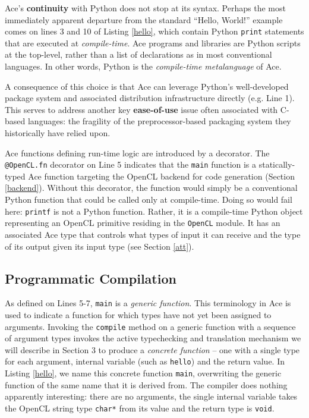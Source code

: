 \documentclass[9pt,preprint]{sigplanconf}
\begin{document}


Ace's \textbf{continuity} with Python does not stop at its syntax. 
Perhaps the most immediately apparent departure from the standard ``Hello, World!'' example comes on lines 3 and 10 of Listing \ref{hello}, which contain Python \verb|print| statements that are executed at {\em compile-time}.  Ace programs and libraries are Python scripts at the top-level, rather than a list of declarations as in most conventional languages. In other words, Python is the {\em compile-time metalanguage} of Ace. 

A consequence of this choice is that Ace can leverage Python's well-developed package system and associated distribution infrastructure directly (e.g. Line 1). This serves to address another key \textbf{ease-of-use} issue often associated with C-based languages: the fragility of the preprocessor-based packaging system they historically have relied upon. 

Ace functions defining run-time logic are introduced by a decorator. The \verb|@OpenCL.fn| decorator on Line 5 indicates that the \verb|main| function is a statically-typed Ace function targeting the OpenCL backend for code generation (Section \ref{backend}). Without this decorator, the function would simply be a conventional Python function that could be called only at compile-time. Doing so would fail here: \verb|printf| is not a Python function. Rather, it is a compile-time Python object representing an OpenCL primitive residing in the \verb|OpenCL| module. It has an associated Ace type that controls what types of input it can receive and the type of its output given its input type (see Section \ref{att}).

\subsection{Programmatic Compilation}
As defined on Lines 5-7, \verb|main| is a \emph{generic function}. This terminology in Ace is used to indicate a function for which types have not yet been assigned to arguments. Invoking the \verb|compile| method on a generic function with a sequence of argument types invokes the active typechecking and translation mechanism we will describe in Section 3 to produce a \emph{concrete function} -- one with a single type for each argument, internal variable (such as \verb|hello|) and the return value. In Listing \ref{hello}, we name this concrete function \verb|main|, overwriting the generic function of the same name that it is derived from. The compiler does nothing apparently interesting: there are no arguments, the single internal variable takes the OpenCL string type \verb|char*| from its value and the return type is \verb|void|. 
\end{document}

